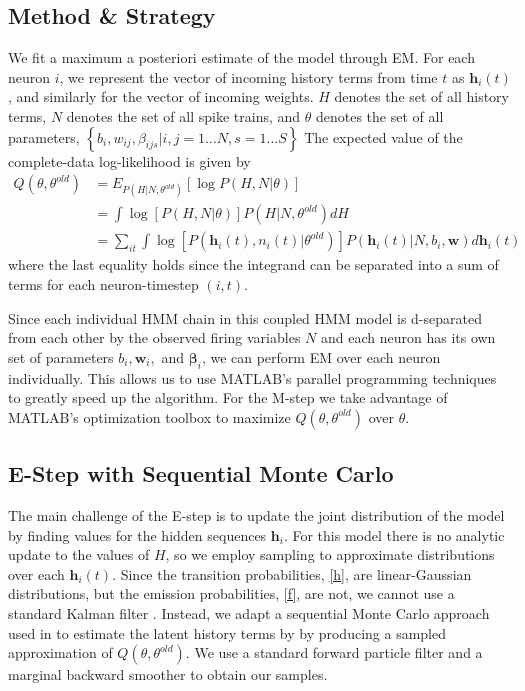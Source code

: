 \documentclass{article}
\begin{document}
\subsection{Method \& Strategy}
We fit a maximum a posteriori estimate of the model through EM.  For
each neuron $i$, we represent the vector of incoming history terms from
time $t$ as $\mathbf{h}_i(t)$, and similarly for the vector of
incoming weights. $H$ denotes the set of all history terms, $N$
denotes the set of all spike trains, and $\theta$ denotes the set
of all parameters,
$\left\{ b_i, w_{ij}, \beta_{ijs} | i,j = 1 \ldots N, s = 1 \ldots S \right\}$
The expected value of the complete-data log-likelihood is given by
\begin{align*} \label{Q}  
Q(\theta,\theta^{old}) &= E_{P(H|N,\theta^{old})} \left[ \log{P(H,N|\theta)} \right] 
\\                     &= \int{ \log\left[P(H,N|\theta)\right] P(H|N,\theta^{old}) dH }
\\                     &= \sum_{it} \int \log\left[P(\mathbf{h}_i(t),n_i(t)|\theta^{old})\right] P(\mathbf{h}_i(t)|N,b_i,\mathbf{w}) d\mathbf{h}_i(t)
\end{align*}
where the last equality holds since the integrand can be separated
into a sum of terms for each neuron-timestep $(i,t)$.

Since each individual HMM chain in this coupled HMM model is d-separated from each other by the observed firing variables $N$ and each neuron has its own set of parameters  $b_i, \mathbf w_i,$ and $\bm{\beta}_i$, we can perform EM over each neuron individually. This allows us to use MATLAB's parallel programming techniques to greatly speed up the algorithm. For the M-step we take advantage of MATLAB's optimization toolbox to maximize $Q(\theta,\theta^{old})$ over $\theta$.

\subsection{E-Step with Sequential Monte Carlo}

The main challenge of the E-step is to update the joint distribution of the model by finding values for the hidden sequences $\mathbf{h}_i$. For this model there is no analytic update to the values of $H$, so we employ sampling to approximate distributions over each $\mathbf{h}_i(t)$. Since the transition probabilities, \eqref{h}, are linear-Gaussian distributions,
but the emission probabilities, \eqref{f}, are not, we cannot
use a standard Kalman filter \citep{bishop}.  Instead, we adapt a
sequential Monte Carlo approach used in \citep{volgelstein2009,
mishchencko2011} to estimate the latent history terms by
by producing a sampled approximation of $Q(\theta,\theta^{old})$. We
use a standard forward particle filter \citep{bishop} and a marginal
backward smoother \citep{doucet2000} to obtain our samples.
\end{document}

